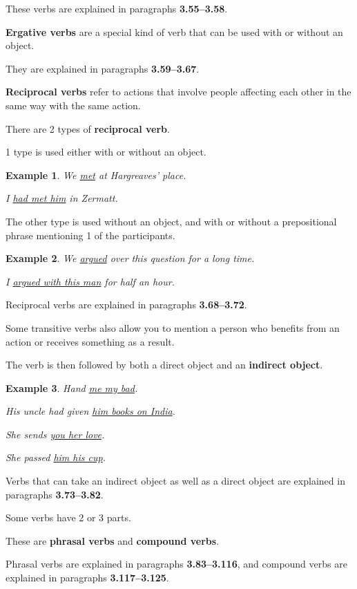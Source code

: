 \documentclass[oneside]{book}
\numberwithin{equation}{section}
\newtheorem{example}{Example}[section]
\begin{document}
These verbs are explained in paragraphs \textbf{3.55--3.58}.

%
\textbf{Ergative verbs} are a special kind of verb that can be used with or without an object.

They are explained in paragraphs \textbf{3.59--3.67}.

%
\noindent{} \textbf{Reciprocal verbs} refer to actions that involve people affecting each other in the same way with the same action.

There are 2 types of \textbf{reciprocal verb}.

1 type is used either with or without an object.
\begin{example}
    We \underline{met} at Hargreaves' place.
    
    I \underline{had met him} in Zermatt.
\end{example}
The other type is used without an object, and with or without a prepositional phrase mentioning 1 of the participants.
\begin{example}
    We \underline{argued} over this question for a long time.
    
    I \underline{argued with this man} for half an hour.
\end{example}
Reciprocal verbs are explained in paragraphs \textbf{3.68--3.72}.

%
\noindent{} Some transitive verbs also allow you to mention a person who benefits from an action or receives something as a result.

The verb is then followed by both a direct object and an \textbf{indirect object}.
\begin{example}
    Hand \underline{me my bad}.
    
    His uncle had given \underline{him books on India}.
    
    She sends \underline{you her love}.
    
    She passed \underline{him his cup}.
\end{example}
Verbs that can take an indirect object as well as a direct object are explained in paragraphs \textbf{3.73--3.82}.

%
\noindent{} Some verbs have 2 or 3 parts.

These are \textbf{phrasal verbs} and \textbf{compound verbs}.

Phrasal verbs are explained in paragraphs \textbf{3.83--3.116}, and compound verbs are explained in paragraphs \textbf{3.117--3.125}.
\end{document}
